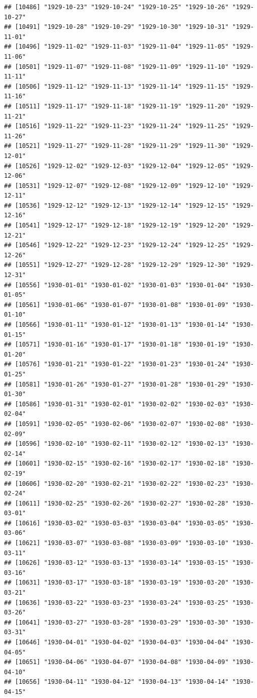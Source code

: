 \documentclass{article}\usepackage[]{graphicx}\usepackage[]{color}
\makeatletter
\newenvironment{kframe}{%
 \def\at@end@of@kframe{}%
 \ifinner\ifhmode%
  \def\at@end@of@kframe{\end{minipage}}%
  \begin{minipage}{\columnwidth}%
 \fi\fi%
 \def\FrameCommand##1{\hskip\@totalleftmargin \hskip-\fboxsep
 \colorbox{shadecolor}{##1}\hskip-\fboxsep
     \hskip-\linewidth \hskip-\@totalleftmargin \hskip\columnwidth}%
 \MakeFramed {\advance\hsize-\width
   \@totalleftmargin\z@ \linewidth\hsize
   \@setminipage}}%
 {\par\unskip\endMakeFramed%
 \at@end@of@kframe}
\newenvironment{knitrout}{}{} %
\makeatother
\begin{document}
\begin{description}
\begin{knitrout}
\begin{kframe}
\begin{verbatim}
## [10486] "1929-10-23" "1929-10-24" "1929-10-25" "1929-10-26" "1929-10-27"
## [10491] "1929-10-28" "1929-10-29" "1929-10-30" "1929-10-31" "1929-11-01"
## [10496] "1929-11-02" "1929-11-03" "1929-11-04" "1929-11-05" "1929-11-06"
## [10501] "1929-11-07" "1929-11-08" "1929-11-09" "1929-11-10" "1929-11-11"
## [10506] "1929-11-12" "1929-11-13" "1929-11-14" "1929-11-15" "1929-11-16"
## [10511] "1929-11-17" "1929-11-18" "1929-11-19" "1929-11-20" "1929-11-21"
## [10516] "1929-11-22" "1929-11-23" "1929-11-24" "1929-11-25" "1929-11-26"
## [10521] "1929-11-27" "1929-11-28" "1929-11-29" "1929-11-30" "1929-12-01"
## [10526] "1929-12-02" "1929-12-03" "1929-12-04" "1929-12-05" "1929-12-06"
## [10531] "1929-12-07" "1929-12-08" "1929-12-09" "1929-12-10" "1929-12-11"
## [10536] "1929-12-12" "1929-12-13" "1929-12-14" "1929-12-15" "1929-12-16"
## [10541] "1929-12-17" "1929-12-18" "1929-12-19" "1929-12-20" "1929-12-21"
## [10546] "1929-12-22" "1929-12-23" "1929-12-24" "1929-12-25" "1929-12-26"
## [10551] "1929-12-27" "1929-12-28" "1929-12-29" "1929-12-30" "1929-12-31"
## [10556] "1930-01-01" "1930-01-02" "1930-01-03" "1930-01-04" "1930-01-05"
## [10561] "1930-01-06" "1930-01-07" "1930-01-08" "1930-01-09" "1930-01-10"
## [10566] "1930-01-11" "1930-01-12" "1930-01-13" "1930-01-14" "1930-01-15"
## [10571] "1930-01-16" "1930-01-17" "1930-01-18" "1930-01-19" "1930-01-20"
## [10576] "1930-01-21" "1930-01-22" "1930-01-23" "1930-01-24" "1930-01-25"
## [10581] "1930-01-26" "1930-01-27" "1930-01-28" "1930-01-29" "1930-01-30"
## [10586] "1930-01-31" "1930-02-01" "1930-02-02" "1930-02-03" "1930-02-04"
## [10591] "1930-02-05" "1930-02-06" "1930-02-07" "1930-02-08" "1930-02-09"
## [10596] "1930-02-10" "1930-02-11" "1930-02-12" "1930-02-13" "1930-02-14"
## [10601] "1930-02-15" "1930-02-16" "1930-02-17" "1930-02-18" "1930-02-19"
## [10606] "1930-02-20" "1930-02-21" "1930-02-22" "1930-02-23" "1930-02-24"
## [10611] "1930-02-25" "1930-02-26" "1930-02-27" "1930-02-28" "1930-03-01"
## [10616] "1930-03-02" "1930-03-03" "1930-03-04" "1930-03-05" "1930-03-06"
## [10621] "1930-03-07" "1930-03-08" "1930-03-09" "1930-03-10" "1930-03-11"
## [10626] "1930-03-12" "1930-03-13" "1930-03-14" "1930-03-15" "1930-03-16"
## [10631] "1930-03-17" "1930-03-18" "1930-03-19" "1930-03-20" "1930-03-21"
## [10636] "1930-03-22" "1930-03-23" "1930-03-24" "1930-03-25" "1930-03-26"
## [10641] "1930-03-27" "1930-03-28" "1930-03-29" "1930-03-30" "1930-03-31"
## [10646] "1930-04-01" "1930-04-02" "1930-04-03" "1930-04-04" "1930-04-05"
## [10651] "1930-04-06" "1930-04-07" "1930-04-08" "1930-04-09" "1930-04-10"
## [10656] "1930-04-11" "1930-04-12" "1930-04-13" "1930-04-14" "1930-04-15"

\end{verbatim}
\end{kframe}
\end{knitrout}
\end{description}
\end{document}
